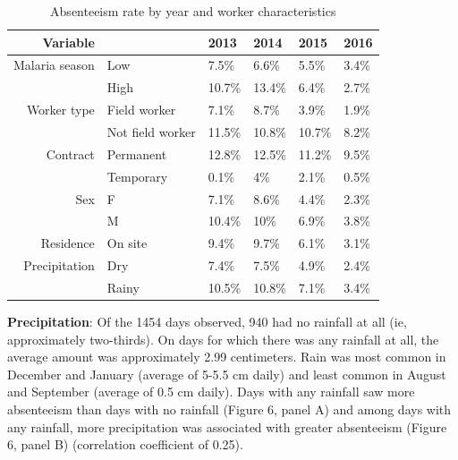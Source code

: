 \documentclass[]{article}
\begin{document}
\begin{table}[ht]
\centering
\begin{tabular}{rlllll}
  \hline
Variable &  & 2013 & 2014 & 2015 & 2016 \\ 
  \hline
Malaria season & Low & 7.5\% & 6.6\% & 5.5\% & 3.4\% \\ 
   & High & 10.7\% & 13.4\% & 6.4\% & 2.7\% \\ 
  Worker type & Field worker & 7.1\% & 8.7\% & 3.9\% & 1.9\% \\ 
   & Not field worker & 11.5\% & 10.8\% & 10.7\% & 8.2\% \\ 
  Contract & Permanent & 12.8\% & 12.5\% & 11.2\% & 9.5\% \\ 
   & Temporary & 0.1\% & 4\% & 2.1\% & 0.5\% \\ 
  Sex & F & 7.1\% & 8.6\% & 4.4\% & 2.3\% \\ 
   & M & 10.4\% & 10\% & 6.9\% & 3.8\% \\ 
  Residence & On site & 9.4\% & 9.7\% & 6.1\% & 3.1\% \\ 
  Precipitation & Dry & 7.4\% & 7.5\% & 4.9\% & 2.4\% \\ 
   & Rainy & 10.5\% & 10.8\% & 7.1\% & 3.4\% \\ 
   \hline
\end{tabular}
\caption{Absenteeism rate by year and worker characteristics} 
\end{table}

\textbf{Precipitation}: Of the 1454 days observed, 940 had no rainfall
at all (ie, approximately two-thirds). On days for which there was any
rainfall at all, the average amount was approximately 2.99 centimeters.
Rain was most common in December and January (average of 5-5.5 cm daily)
and least common in August and September (average of 0.5 cm daily). Days
with any rainfall saw more absenteeism than days with no rainfall
(Figure 6, panel A) and among days with any rainfall, more precipitation
was associated with greater absenteeism (Figure 6, panel B) (correlation
coefficient of 0.25).
\end{document}
